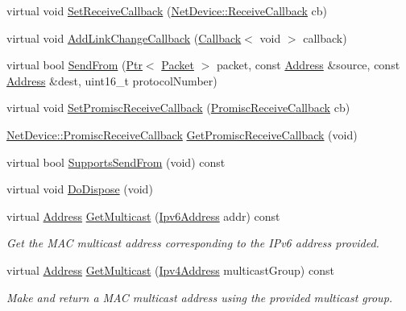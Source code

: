 \begin{DoxyCompactItemize}
\item 
virtual void \hyperlink{classns3_1_1WimaxNetDevice_a64f09d82786f9c5b16e64a4d24f9447d}{Set\+Receive\+Callback} (\hyperlink{classns3_1_1NetDevice_ad5e5e1ca187472bc2ba99575d8def568}{Net\+Device\+::\+Receive\+Callback} cb)
\item 
virtual void \hyperlink{classns3_1_1WimaxNetDevice_a9721efe0df62acad02abc6ceb43f72fc}{Add\+Link\+Change\+Callback} (\hyperlink{classns3_1_1Callback}{Callback}$<$ void $>$ callback)
\item 
virtual bool \hyperlink{classns3_1_1WimaxNetDevice_a852b3f9de55aa0fac3974e7bb34679e4}{Send\+From} (\hyperlink{classns3_1_1Ptr}{Ptr}$<$ \hyperlink{classns3_1_1Packet}{Packet} $>$ packet, const \hyperlink{classns3_1_1Address}{Address} \&source, const \hyperlink{classns3_1_1Address}{Address} \&dest, uint16\+\_\+t protocol\+Number)
\item 
virtual void \hyperlink{classns3_1_1WimaxNetDevice_a84be695ae60f871acfb9a817529a5df3}{Set\+Promisc\+Receive\+Callback} (\hyperlink{classns3_1_1NetDevice_a427225795919f26c414bee2ea3f31ed2}{Promisc\+Receive\+Callback} cb)
\item 
\hyperlink{classns3_1_1NetDevice_a427225795919f26c414bee2ea3f31ed2}{Net\+Device\+::\+Promisc\+Receive\+Callback} \hyperlink{classns3_1_1WimaxNetDevice_a291fa328828fad4247ba0784f12f8e71}{Get\+Promisc\+Receive\+Callback} (void)
\item 
virtual bool \hyperlink{classns3_1_1WimaxNetDevice_abc9e19c2f77d03639c8d094a840402ee}{Supports\+Send\+From} (void) const 
\item 
virtual void \hyperlink{classns3_1_1WimaxNetDevice_a63b484b4e6d842fc80662876070bdbfc}{Do\+Dispose} (void)
\item 
virtual \hyperlink{classns3_1_1Address}{Address} \hyperlink{classns3_1_1WimaxNetDevice_a22b3e2e4c4b1e3c745a7ee40284d0347}{Get\+Multicast} (\hyperlink{classns3_1_1Ipv6Address}{Ipv6\+Address} addr) const 
\begin{DoxyCompactList}\small\item\em Get the M\+AC multicast address corresponding to the I\+Pv6 address provided. \end{DoxyCompactList}\item 
virtual \hyperlink{classns3_1_1Address}{Address} \hyperlink{classns3_1_1WimaxNetDevice_a5c0f30c1f8407b93ae4fcc3462781c10}{Get\+Multicast} (\hyperlink{classns3_1_1Ipv4Address}{Ipv4\+Address} multicast\+Group) const 
\begin{DoxyCompactList}\small\item\em Make and return a M\+AC multicast address using the provided multicast group. \end{DoxyCompactList}\item 

\end{DoxyCompactItemize}
